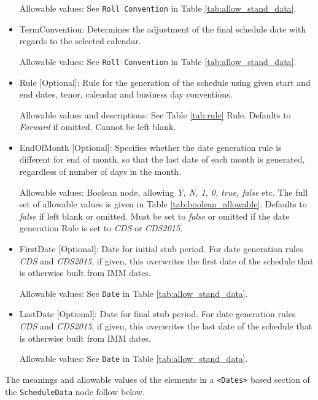 \begin{itemize}
Allowable values: See \lstinline!Roll Convention! in Table
\ref{tab:allow_stand_data}.

\item TermConvention: Determines the adjustment of the final schedule
  date with regards to the selected calendar. 

Allowable values: See \lstinline!Roll Convention! in Table \ref{tab:allow_stand_data}.

\item Rule [Optional]: Rule for the generation of the schedule using given
  start and end dates, tenor, calendar and business day conventions. 

Allowable values and descriptions: See Table \ref{tab:rule} Rule. Defaults to \emph{Forward} if omitted. Cannot be left blank.

\item EndOfMonth [Optional]: Specifies whether the date generation rule is different for end of month, so that the last date of each month is generated, regardless of number of days in the month.

Allowable values: Boolean node, allowing \emph{Y, N, 1, 0, true, false} etc. The full set of allowable values is given in Table \ref{tab:boolean_allowable}. Defaults to \emph{false} if left blank or omitted. Must be set to \emph{false} or omitted if the date generation Rule is set to \emph{CDS} or \emph{CDS2015}.

\item FirstDate [Optional]: Date for initial stub period. For date generation rules \emph{CDS} and \emph{CDS2015}, if given, this
  overwrites the first date of the schedule that is otherwise built from IMM dates.

Allowable values: See \lstinline!Date! in Table \ref{tab:allow_stand_data}.

\item LastDate [Optional]: Date for final stub period. For date generation rules \emph{CDS} and \emph{CDS2015}, if given, this
  overwrites the last date of the schedule that is otherwise built from IMM dates.

Allowable values: See \lstinline!Date! in Table \ref{tab:allow_stand_data}.
\end{itemize}

\medskip
The meanings and allowable values of the elements in a {\tt <Dates>} based section of the  \lstinline!ScheduleData! node follow below.

